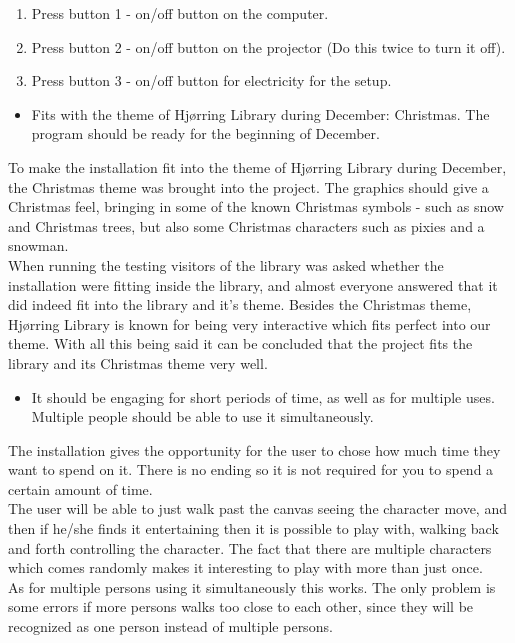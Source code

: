 \begin{itemize}
\begin{enumerate}
\item Press button 1 - on/off button on the computer.
\item Press button 2 - on/off button on the projector (Do this twice to turn it off).
\item Press button 3 - on/off button for electricity for the setup.
\end{enumerate}
\begin{itemize}
\item Fits with the theme of Hj{\o}rring Library during December: Christmas. The program should be ready for the beginning of December.
\end{itemize}
To make the installation fit into the theme of Hj{\o}rring Library during December, the Christmas theme was brought into the project. The graphics should give a Christmas feel, bringing in some of the known Christmas symbols - such as snow and Christmas trees, but also some Christmas characters such as pixies and a snowman.\\
When running the testing visitors of the library was asked whether the installation were fitting inside the library, and almost everyone answered that it did indeed fit into the library and it's theme.
Besides the Christmas theme, Hj{\o}rring Library is known for being very interactive which fits perfect into our theme. With all this being said it can be concluded that the project fits the library and its Christmas theme very well.
\begin{itemize}
\item It should be engaging for short periods of time, as well as for multiple uses. Multiple people should be able to use it simultaneously.
\end{itemize}
The installation gives the opportunity for the user to chose how much time they want to spend on it. There is no ending so it is not required for you to spend a certain amount of time. \\
The user will be able to just walk past the canvas seeing the character move, and then if he/she finds it entertaining then it is possible to play with, walking back and forth controlling the character. The fact that there are multiple characters which comes randomly makes it interesting to play with more than just once.\\
As for multiple persons using it simultaneously this works. The only problem is some errors if more persons walks too close to each other, since they will be recognized as one person instead of multiple persons.

\end{itemize}
